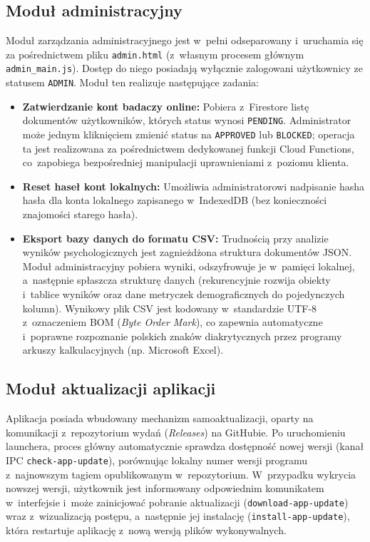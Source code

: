 \documentclass[12pt, a4paper, oneside]{report}
\begin{document}
\subsection{Moduł administracyjny}
\label{subsec:impl-admin}

Moduł zarządzania administracyjnego jest w~pełni odseparowany i~uruchamia się za pośrednictwem pliku \texttt{admin.html} (z~własnym procesem głównym \texttt{admin\_main.js}). Dostęp do niego posiadają wyłącznie zalogowani użytkownicy ze statusem \texttt{ADMIN}. Moduł ten realizuje następujące zadania:
\begin{itemize}
	\item \textbf{Zatwierdzanie kont badaczy online:} Pobiera z~Firestore listę dokumentów użytkowników, których status wynosi \texttt{PENDING}. Administrator może jednym kliknięciem zmienić status na \texttt{APPROVED} lub \texttt{BLOCKED}; operacja ta jest realizowana za pośrednictwem dedykowanej funkcji Cloud Functions, co~zapobiega bezpośredniej manipulacji uprawnieniami z~poziomu klienta.
	\item \textbf{Reset haseł kont lokalnych:} Umożliwia administratorowi nadpisanie hasha hasła dla konta lokalnego zapisanego w~IndexedDB (bez konieczności znajomości starego hasła).
	\item \textbf{Eksport bazy danych do formatu CSV:} Trudnością przy analizie wyników psychologicznych jest zagnieżdżona struktura dokumentów JSON. Moduł administracyjny pobiera wyniki, odszyfrowuje je w~pamięci lokalnej, a~następnie spłaszcza strukturę danych (rekurencyjnie rozwija obiekty i~tablice wyników oraz dane metryczek demograficznych do pojedynczych kolumn). Wynikowy plik CSV jest kodowany w~standardzie UTF-8 z~oznaczeniem BOM (\textit{Byte Order Mark}), co zapewnia automatyczne i~poprawne rozpoznanie polskich znaków diakrytycznych przez programy arkuszy kalkulacyjnych (np. Microsoft Excel).
\end{itemize}

\subsection{Moduł aktualizacji aplikacji}
\label{subsec:impl-update}

Aplikacja posiada wbudowany mechanizm samoaktualizacji, oparty na komunikacji z~repozytorium wydań (\textit{Releases}) na GitHubie. Po uruchomieniu launchera, proces główny automatycznie sprawdza dostępność nowej wersji (kanał IPC \texttt{check-app-update}), porównując lokalny numer wersji programu z~najnowszym tagiem opublikowanym w~repozytorium. W~przypadku wykrycia nowszej wersji, użytkownik jest informowany odpowiednim komunikatem w~interfejsie i~może zainicjować pobranie aktualizacji (\texttt{download-app-update}) wraz z~wizualizacją postępu, a~następnie jej instalację (\texttt{install-app-update}), która restartuje aplikację z~nową wersją plików wykonywalnych.
\end{document}
